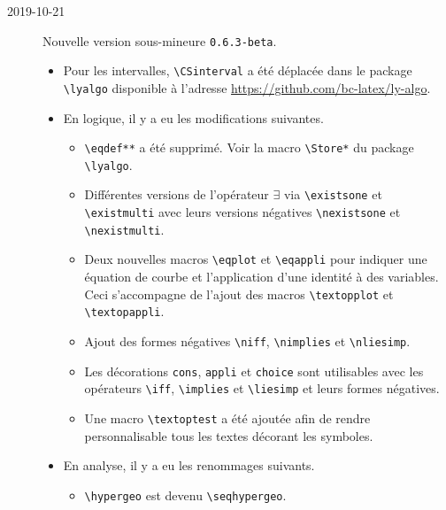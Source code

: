\documentclass[12pt,a4paper]{article}
\begin{document}
\begin{description}

    \medskip
    \item[2019-10-21] Nouvelle version sous-mineure \verb+0.6.3-beta+.
    
    \begin{itemize}[itemsep=.5em]
        \item Pour les intervalles, \verb+\CSinterval+ a été déplacée dans le package \verb+\lyalgo+ disponible à l'adresse \url{https://github.com/bc-latex/ly-algo}.
    
    
        \item En logique, il y a eu les modifications suivantes.
        \begin{itemize}[itemsep=.5em]
            \item \verb+\eqdef**+ a été supprimé. Voir la macro \verb+\Store*+ du package \verb+\lyalgo+.
    
            \item Différentes versions de l'opérateur $\exists$ via \verb+\existsone+ et \verb+\existmulti+ avec leurs versions négatives \verb+\nexistsone+ et \verb+\nexistmulti+.
    
            \item Deux nouvelles macros \verb+\eqplot+ et \verb+\eqappli+ pour indiquer une équation de courbe et l'application d'une identité à des variables. Ceci s'accompagne de l'ajout des macros \verb+\textopplot+ et \verb+\textopappli+.
    
            \item Ajout des formes négatives \verb+\niff+, \verb+\nimplies+ et \verb+\nliesimp+.
    
            \item Les décorations \verb+cons+, \verb+appli+ et \verb+choice+ sont utilisables avec les opérateurs \verb+\iff+, \verb+\implies+ et \verb+\liesimp+ et leurs formes négatives.
    
            \item Une macro \verb+\textoptest+ a été ajoutée afin de rendre personnalisable tous les textes décorant les symboles.
        \end{itemize}
    
    
        \item En analyse, il y a eu les renommages suivants.
        \begin{itemize}[itemsep=.5em]
            \item \verb+\hypergeo+ est devenu \verb+\seqhypergeo+.
    

\end{itemize}
\end{itemize}
\end{description}
\end{document}
